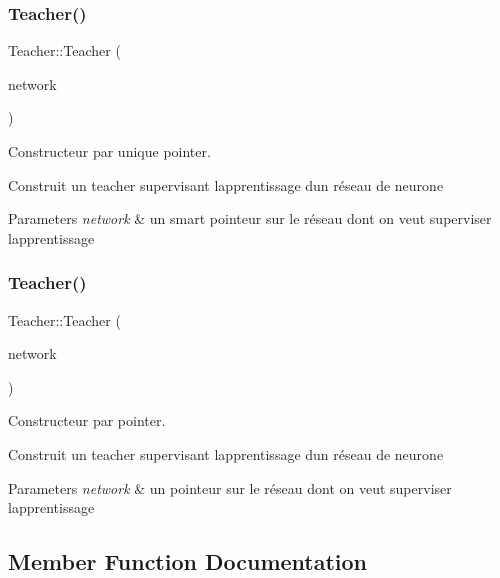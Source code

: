 \subsubsection{\texorpdfstring{Teacher()}{Teacher()}\hspace{0.1cm}{\footnotesize\ttfamily [1/2]}}
{\footnotesize\ttfamily Teacher\+::\+Teacher (\begin{DoxyParamCaption}\item[{\hyperlink{classNeuralNetwork_a31de381df65f261fd0f38e0559995d1a}{Neural\+Network\+::\+Ptr}}]{network }\end{DoxyParamCaption})}



Constructeur par unique pointer. 

Construit un teacher supervisant l\textquotesingle{}apprentissage d\textquotesingle{}un réseau de neurone 
\begin{DoxyParams}{Parameters}
{\em network} & un smart pointeur sur le réseau dont on veut superviser l\textquotesingle{}apprentissage \\
\hline
\end{DoxyParams}
\mbox{\label{classTeacher_afd32ab70242f2c5886d030a5e7d05919}} 
\subsubsection{\texorpdfstring{Teacher()}{Teacher()}\hspace{0.1cm}{\footnotesize\ttfamily [2/2]}}
{\footnotesize\ttfamily Teacher\+::\+Teacher (\begin{DoxyParamCaption}\item[{\hyperlink{classNeuralNetwork}{Neural\+Network} $\ast$}]{network }\end{DoxyParamCaption})}



Constructeur par pointer. 

Construit un teacher supervisant l\textquotesingle{}apprentissage d\textquotesingle{}un réseau de neurone 
\begin{DoxyParams}{Parameters}
{\em network} & un pointeur sur le réseau dont on veut superviser l\textquotesingle{}apprentissage \\
\hline
\end{DoxyParams}


\subsection{Member Function Documentation}
\mbox{\label{classTeacher_a99fc69c5319be890394d2c8503e217c8}} 
